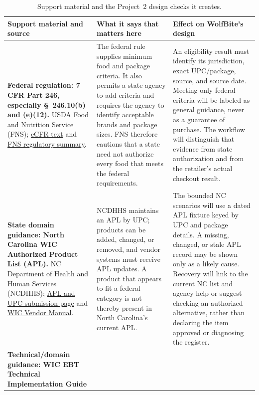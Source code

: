 \documentclass[sigconf]{acmart}
\begin{document}
\begin{table}[t]
  \caption{Support material and the Project~2 design checks it creates.}
  \label{tab:support}
  \centering
  \footnotesize
  \begin{tabular}{L{3.8cm}L{5.1cm}L{6.1cm}}
    \toprule
    Support material and source & What it says that matters here & Effect on WolfBite's design \\
    \midrule
    \textbf{Federal regulation: 7 CFR Part 246, especially
    \S~246.10(b) and (e)(12).} USDA Food and Nutrition Service (FNS);
    \href{https://www.ecfr.gov/current/title-7/subtitle-B/chapter-II/subchapter-A/part-246/section-246.10}{eCFR text} and
    \href{https://www.fns.usda.gov/wic/food-packages/regulatory-requirements}{FNS regulatory summary}. &
    The federal rule supplies minimum food and package criteria.  It also
    permits a state agency to add criteria and requires the agency to identify
    acceptable brands and package sizes.  FNS therefore cautions that a state
    need not authorize every food that meets the federal requirements. &
    An eligibility result must identify its jurisdiction, exact UPC/package,
    source, and source date.  Meeting only federal criteria will be labeled as
    general guidance, never as a guarantee of purchase.  The workflow will
    distinguish that evidence from state authorization and from the retailer's
    actual checkout result. \\
    \addlinespace[0.2em]
    \textbf{State domain guidance: North Carolina WIC Authorized Product List
    (APL).} NC Department of Health and Human Services (NCDHHS);
    \href{https://www.ncdhhs.gov/divisions/child-and-family-well-being/community-nutrition-services-section/wic/vendors/nc-wic-authorized-product-list-apl}{APL and UPC-submission page} and
    \href{https://www.ncdhhs.gov/wic-vendor-manual-0}{WIC Vendor Manual}. &
    NCDHHS maintains an APL by UPC; products can be added, changed, or removed,
    and vendor systems must receive APL updates.  A product that appears to fit
    a federal category is not thereby present in North Carolina's current APL. &
    The bounded NC scenarios will use a dated APL fixture keyed by UPC and
    package details.  A missing, changed, or stale APL record may be shown only
    as a likely cause.  Recovery will link to the current NC list and agency
    help or suggest checking an authorized alternative, rather than declaring
    the item approved or diagnosing the register. \\
    \addlinespace[0.2em]
    \textbf{Technical/domain guidance: WIC EBT Technical Implementation Guide
}
\end{tabular}
\end{table}
\end{document}

